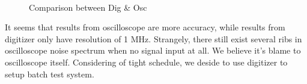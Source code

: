 \documentclass[11pt,a4paper]{article}
\begin{document}

    \begin{figure}[ht]
        \centering
        \hspace{20pt}
        \
        \caption{Comparison between Dig \& Osc}\label{fig:Noise Comparison}
    \end{figure}

    It seems that results from oscilloscope are more accuracy, while results from digitizer only have resolution of 1 MHz.
    Strangely, there still exist several ribs in oscilloscope noise spectrum when no signal input at all.
    We believe it's blame to oscilloscope itself.
    Considering of tight schedule, we deside to use digitizer to setup batch test system.
        
\end{document}
